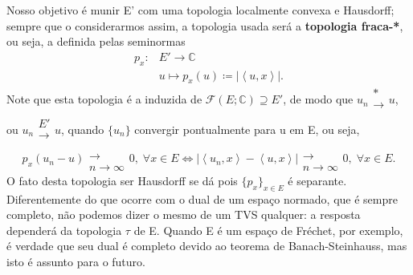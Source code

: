 \documentclass[../distribution_theory_notes.tex]{subfiles}
\begin{document}
Nosso objetivo é munir E' com uma topologia localmente convexa e Hausdorff; sempre que o considerarmos assim, a topologia usada será a \textbf{topologia fraca-*}, ou seja, a definida pelas seminormas
\begin{align*}
	p_{x}: & E'\rightarrow \mathbb{C}                           \\
	       & u\mapsto p_{x}(u) \coloneqq |\left< u, x \right>|.
\end{align*}
Note que esta topologia é a induzida de \(\mathcal{F}(E; \mathbb{C})\supseteq E'\), de modo que \(u_{n}\substack{* \\ \longrightarrow \\ }u\), ou \(u_{n}\substack{E' \\ \longrightarrow \\ }u\), quando \(\{u_{n}\}\) convergir pontualmente para u em E, ou seja,
\[
	p_{x}(u_{n}-u)\substack{ \\ \longrightarrow \\ n\to \infty}0,\; \forall x\in E \Longleftrightarrow |\left< u_{n}, x \right>-\left< u, x \right>|\substack{ \\ \longrightarrow \\ n\to \infty}0,\; \forall x\in E.
\]
O fato desta topologia ser Hausdorff se dá pois \(\{p_{x}\}_{x\in E}\) é separante. Diferentemente do que ocorre com o dual de um espaço normado, que é sempre completo, não podemos dizer o mesmo de um TVS qualquer: a resposta dependerá da topologia \(\tau \) de E. Quando E é um espaço de Fréchet, por exemplo, é verdade que seu dual é completo devido ao teorema de Banach-Steinhauss, mas isto é assunto para o futuro.
\end{document}
